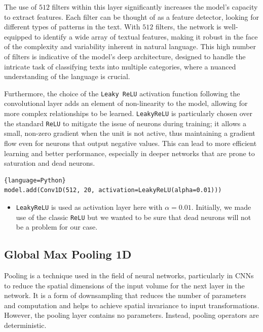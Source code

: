 The use of $512$ filters within this layer significantly increases the model's capacity to extract features. Each filter can be thought of as a feature detector, looking for different types of patterns in the text. With $512$ filters, the network is well-equipped to identify a wide array of textual features, making it robust in the face of the complexity and variability inherent in natural language. This high number of filters is indicative of the model's deep architecture, designed to handle the intricate task of classifying texts into multiple categories, where a nuanced understanding of the language is crucial.

Furthermore, the choice of the \verb|Leaky ReLU| activation function following the convolutional layer adds an element of non-linearity to the model, allowing for more complex relationships to be learned. \verb|LeakyReLU| is particularly chosen over the standard \verb|ReLU| to mitigate the issue of neurons  during training; it allows a small, non-zero gradient when the unit is not active, thus maintaining a gradient flow even for neurons that output negative values. This can lead to more efficient learning and better performance, especially in deeper networks that are prone to saturation and dead neurons.
\begin{lstlisting}{language=Python}
model.add(Conv1D(512, 20, activation=LeakyReLU(alpha=0.01)))
\end{lstlisting}
	
\begin{itemize}
	\item \verb|LeakyReLU| is used as activation layer here with $\alpha=0.01$. Initially, we made use of the classic \verb|ReLU| but we wanted to be sure that dead neurons will not be a problem for our case.
\end{itemize}

\subsection{Global Max Pooling 1D}
Pooling is a technique used in the field of neural networks, particularly in CNNs to reduce the spatial dimensions of the input volume for the next layer in the network. It is a form of downsampling that reduces the number of parameters and computation and helps to achieve spatial invariance to input transformations. However, the pooling layer contains no parameters. Instead, pooling operators are deterministic.\\

